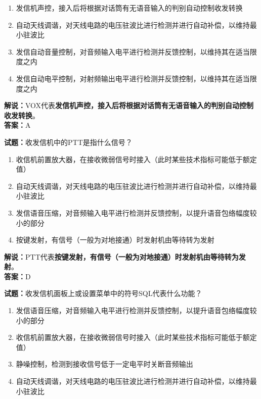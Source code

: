 \documentclass{ctexbook}
\begin{document}
\begin{enumerate}[leftmargin=3em]
	\item 发信机声控，接入后将根据对话筒有无语音输入的判别自动控制收发转换
	\item 自动天线调谐，对天线电路的电压驻波比进行检测并进行自动补偿，以维持最小驻波比
	\item 发信自动音量控制，对音频输入电平进行检测并反馈控制，以维持其在适当限度之内
	\item 发信自动电平控制，对射频输出电平进行检测并反馈控制，以维持其在适当限度之内
\end{enumerate}

\noindent\textbf{解说：}VOX代表\textbf{发信机声控，接入后将根据对话筒有无语音输入的判别自动控制收发转换}。\\\noindent\textbf{答案：}A


\bigskip


\noindent\textbf{试题：}收发信机中的PTT是指什么信号？

\begin{enumerate}[leftmargin=3em]
	\item 收信机前置放大器，在接收微弱信号时接入（此时某些技术指标可能低于额定值）
	\item 自动天线调谐，对天线电路的电压驻波比进行检测并进行自动补偿，以维持最小驻波比
	\item 发信语音压缩，对音频输入电平进行检测并反馈控制，以提升语音包络幅度较小的部分
	\item 按键发射，有信号（一般为对地接通）时发射机由等待转为发射
\end{enumerate}

\noindent\textbf{解说：}PTT代表\textbf{按键发射，有信号（一般为对地接通）时发射机由等待转为发射}。\\\noindent\textbf{答案：}D


\bigskip


\noindent\textbf{试题：}收发信机面板上或设置菜单中的符号SQL代表什么功能？

\begin{enumerate}[leftmargin=3em]
	\item 发信语音压缩，对音频输入电平进行检测并反馈控制，以提升语音包络幅度较小的部分
	\item 收信机前置放大器，在接收微弱信号时接入（此时某些技术指标可能低于额定值）
	\item 静噪控制，检测到接收信号低于一定电平时关断音频输出
	\item 自动天线调谐，对天线电路的电压驻波比进行检测并进行自动补偿，以维持最小驻波比
\end{enumerate}
\end{document}
